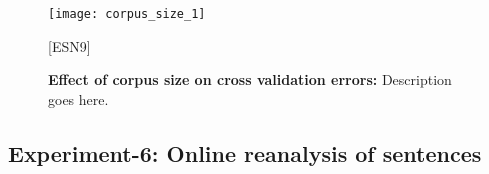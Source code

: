 \begin{figure}[hbtp]
\centering
\texttt{[image: corpus\_size\_1]}
\caption{\textbf{Effect of corpus size on cross validation errors:} Description goes here.}[ESN9]
\label{fig:sem_rel}
\end{figure}

\subsection{Experiment-6: Online reanalysis of sentences}

 
 

 
 


